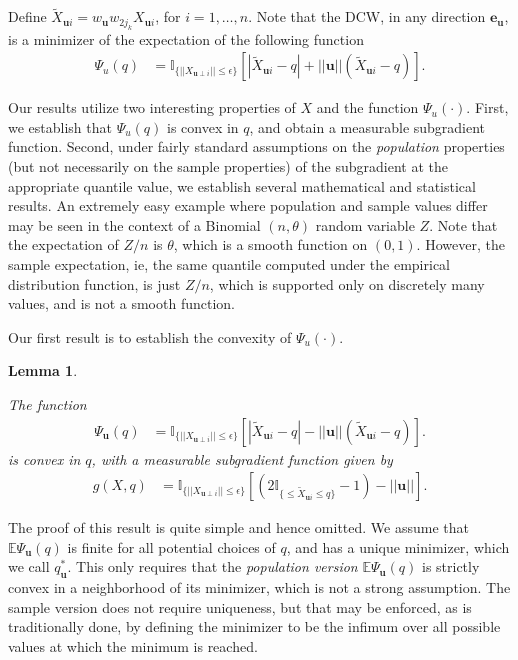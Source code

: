 \documentclass[twoside]{article}
\newtheorem{Lemma}{Lemma}[section]
\newcommand{\mbfeu}{\mathbf{e}_{\mathbf u} }
\begin{document}
Define $\tilde X_{\mathbf{u} i} = 
w_{\mathbf{u}} w_{2 j_{k}} X_{\mathbf{u} i}$, for $i =1, \ldots, n$.  
Note that the DCW, in any direction $\mbfeu$, is a minimizer of the expectation of the
following function 
\begin{eqnarray*}
\Psi_{u} (q) &  = 
\mathbb{I}_{ \{ || X_{\mathbf{u} \perp i} || \leq \epsilon \}} 
\left[ | \tilde X_{\mathbf{u} i}  - q | + ||\mathbf{u}|| (\tilde X_{\mathbf{u} i}  - q ) 
\right].
\end{eqnarray*}

Our results utilize two interesting properties of $X$ and the function 
$\Psi_{u} (\cdot)$. First, we establish that $\Psi_{u} (q)$ is convex in $q$, and 
obtain a measurable subgradient function. Second, under fairly standard assumptions on 
the {\it population} properties (but not necessarily on the sample properties) of 
the subgradient at the appropriate quantile value, we establish several mathematical 
and statistical results. An extremely easy 
example where population and sample values differ 
may be seen in the context of a Binomial $(n, \theta)$ random variable $Z$. Note that 
the expectation of $Z/n$ is $\theta$, which is a smooth function on $(0, 1)$. However, 
the sample expectation, ie, the same quantile computed under the empirical distribution 
function, is just $Z/n$, which is supported only on discretely many values, and is not 
a smooth function. 



Our first result is to establish the convexity of $\Psi_{u} (\cdot)$.

\begin{Lemma} \label{prop:Convexity}

The function
\begin{eqnarray*}
\Psi_{\mathbf{u}} (q) &  = 
\mathbb{I}_{ \{ || X_{\mathbf{u} \perp i} || \leq \epsilon \}} 
\left[ | \tilde X_{\mathbf{u} i}  - q | - ||\mathbf{u}|| (\tilde X_{\mathbf{u} i}  - q ) 
\right].
\end{eqnarray*}
is convex in $q$, with a measurable subgradient function given by
 \begin{eqnarray*}
g (X, q) & = 
\mathbb{I}_{ \{ || X_{\mathbf{u} \perp i} || \leq \epsilon \}} 
\left[ \left( 2 \mathbb{I}_{ \{ \leq \tilde{X}_{\mathbf{u} i} \leq q \}} - 1 \right)
- ||\mathbf{u}|| \right].
\end{eqnarray*}

\end{Lemma}

The proof of this result is quite simple and hence omitted. 
We assume that $\mathbb{E} \Psi_{\mathbf{u}} (q) $ is finite for all potential choices 
of $q$, and has a unique minimizer, which we call $q_{\mathbf{u}}^{*}$. 
This only requires that the {\it population version} 
$\mathbb{E} \Psi_{\mathbf{u}} (q) $ is strictly convex in a neighborhood of its minimizer, 
which is not a strong assumption. The sample version does not require uniqueness, but 
that may be enforced, as is traditionally done,  by defining the minimizer to be the infimum over all possible values at which the minimum is reached.
\end{document}
